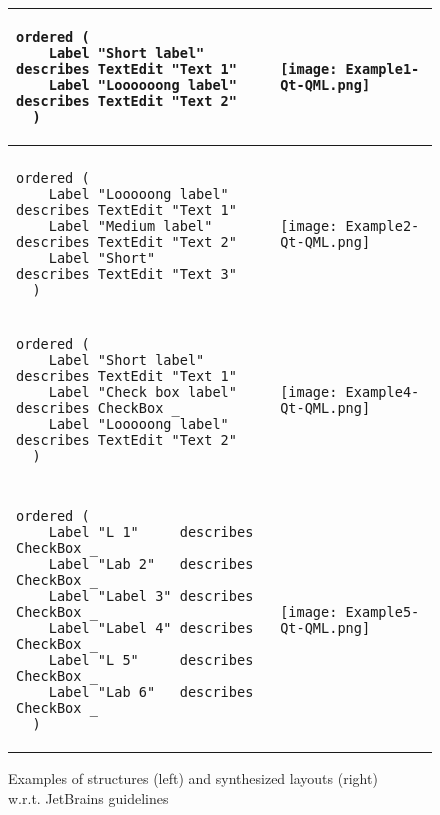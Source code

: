 \begin{figure*}
    \begin{tabular}{m{95mm}m{5cm}}
      \begin{lstlisting}[basicstyle=\small]
  ordered (
    Label "Short label"     describes TextEdit "Text 1"
    Label "Loooooong label" describes TextEdit "Text 2"
  )
      \end{lstlisting} &
      \texttt{[image: Example1-Qt-QML.png]} \\
      \hline\\
      \begin{lstlisting}[basicstyle=\small]
  ordered (
    Label "Looooong label" describes TextEdit "Text 1"
    Label "Medium label"   describes TextEdit "Text 2"
    Label "Short"          describes TextEdit "Text 3"
  )
      \end{lstlisting} &
      \texttt{[image: Example2-Qt-QML.png]} \\
      \hline
      \begin{lstlisting}[basicstyle=\small]
  ordered (
    Label "Short label"     describes TextEdit "Text 1"
    Label "Check box label" describes CheckBox _
    Label "Looooong label"  describes TextEdit "Text 2"
  )
      \end{lstlisting} &
      \vspace{1em}\texttt{[image: Example4-Qt-QML.png]} \\
      \hline\\
      \begin{lstlisting}[basicstyle=\small]
  ordered (
    Label "L 1"     describes CheckBox _
    Label "Lab 2"   describes CheckBox _
    Label "Label 3" describes CheckBox _
    Label "Label 4" describes CheckBox _
    Label "L 5"     describes CheckBox _
    Label "Lab 6"   describes CheckBox _
  )
      \end{lstlisting} &
      \texttt{[image: Example5-Qt-QML.png]} \\
    \end{tabular}
    \caption{Examples of structures (left) and synthesized layouts (right)\\
      w.r.t. JetBrains guidelines}
    \label{fig:evaluation}
  \end{figure*}
